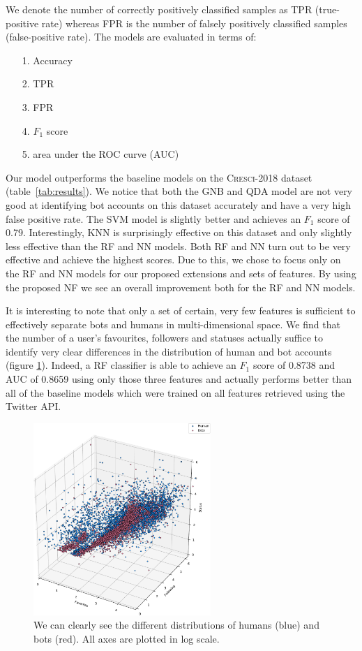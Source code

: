 \noindent We denote the number of correctly positively classified samples as TPR (true-positive rate) whereas FPR is the number of falsely positively classified samples (false-positive rate). The models are evaluated in terms of:
\begin{itemize}
    \item[1.] Accuracy
    \item[2.] TPR
    \item[3.] FPR
    \item[4.] $F_1$ score
    \item[5.] area under the ROC curve (AUC)
\end{itemize}

Our model outperforms the baseline models on the \textsc{Cresci-2018} dataset (table~\ref{tab:results}). We notice that both the GNB and QDA model are not very good at identifying bot accounts on this dataset accurately and have a very high false positive rate. The SVM model is slightly better and achieves an $F_1$ score of 0.79. Interestingly, KNN is surprisingly effective on this dataset and only slightly less effective than the RF and NN models. Both RF and NN turn out to be very effective and achieve the highest scores. Due to this, we chose to focus only on the RF and NN models for our proposed extensions and sets of features. By using the proposed NF we see an overall improvement both for the RF and NN models.

It is interesting to note that only a set of certain, very few features is sufficient to effectively separate bots and humans in multi-dimensional space. We find that the number of a user's favourites, followers and statuses actually suffice to identify very clear differences in the distribution of human and bot accounts (figure \ref{fig:3dvis}). Indeed, a RF classifier is able to achieve an $F_1$ score of 0.8738 and AUC of 0.8659 using only those three features and actually performs better than all of the baseline models which were trained on all features retrieved using the Twitter API.

\begin{figure}[t]
    \centering
    \includegraphics[width=0.6\textwidth]{FIG/3dvis_base-crop.pdf}
    \caption{We can clearly see the different distributions of humans (blue) and bots (red). All axes are plotted in log scale.}
    \label{fig:3dvis}
\end{figure}

